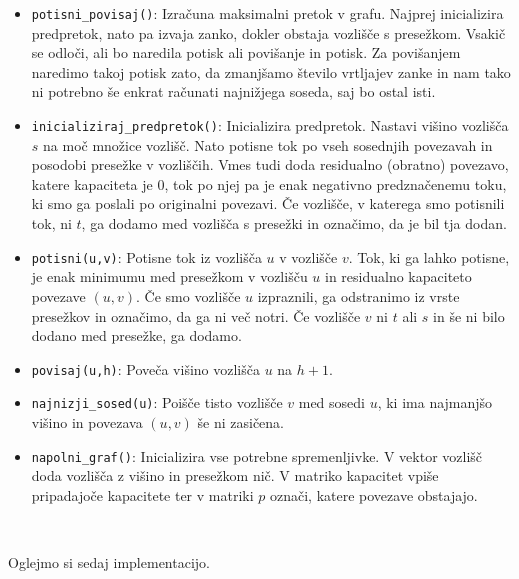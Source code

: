 \documentclass[mat1]{fmfdelo}
\begin{document}
\begin{itemize}
\item \texttt{potisni\_povisaj()}: Izračuna maksimalni pretok v grafu. Najprej inicializira predpretok, nato pa izvaja zanko, dokler obstaja vozlišče s presežkom. Vsakič se odloči, ali bo naredila potisk ali povišanje in potisk. Za povišanjem naredimo takoj potisk zato, da zmanjšamo število vrtljajev zanke in nam tako ni potrebno še enkrat računati najnižjega soseda, saj bo ostal isti.
\item \texttt{inicializiraj\_predpretok()}: Inicializira predpretok. Nastavi višino vozlišča $s$ na moč množice vozlišč. Nato potisne tok po vseh sosednjih povezavah in posodobi presežke v vozliščih. Vmes tudi doda residualno (obratno) povezavo, katere kapaciteta je $0$, tok po njej pa je enak negativno predznačenemu toku, ki smo ga poslali po originalni povezavi. Če vozlišče, v katerega smo potisnili tok, ni $t$, ga dodamo med vozlišča s presežki in označimo, da je bil tja dodan.
\item \texttt{potisni(u,v)}: Potisne tok iz vozlišča $u$ v vozlišče $v$. Tok, ki ga lahko potisne, je enak minimumu med presežkom v vozlišču $u$ in residualno kapaciteto povezave $(u,v)$. Če smo vozlišče $u$ izpraznili, ga odstranimo iz vrste presežkov in označimo, da ga ni več notri. Če vozlišče $v$ ni $t$ ali $s$ in še ni bilo dodano med presežke, ga dodamo.
\item \texttt{povisaj(u,h)}: Poveča višino vozlišča $u$ na $h+1$.
\item \texttt{najnizji\_sosed(u)}: Poišče tisto vozlišče $v$ med sosedi $u$, ki ima najmanjšo višino in povezava $(u,v)$ še ni zasičena.
\item \texttt{napolni\_graf()}: Inicializira vse potrebne spremenljivke. V vektor vozlišč doda vozlišča z višino in presežkom nič. V matriko kapacitet vpiše pripadajoče kapacitete ter v matriki $p$ označi, katere povezave obstajajo.
\end{itemize}~

Oglejmo si sedaj implementacijo.
\end{document}
